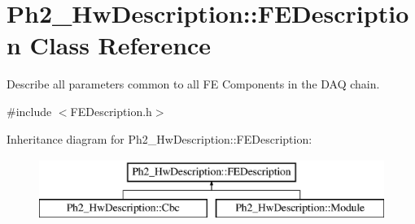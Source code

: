 \hypertarget{class_ph2___hw_description_1_1_f_e_description}{\section{Ph2\-\_\-\-Hw\-Description\-:\-:F\-E\-Description Class Reference}
\label{class_ph2___hw_description_1_1_f_e_description}
}


Describe all parameters common to all F\-E Components in the D\-A\-Q chain.  




{\ttfamily \#include $<$F\-E\-Description.\-h$>$}

Inheritance diagram for Ph2\-\_\-\-Hw\-Description\-:\-:F\-E\-Description\-:\begin{figure}[H]
\begin{center}
\leavevmode
\includegraphics[height=2.000000cm]{class_ph2___hw_description_1_1_f_e_description}
\end{center}
\end{figure}
